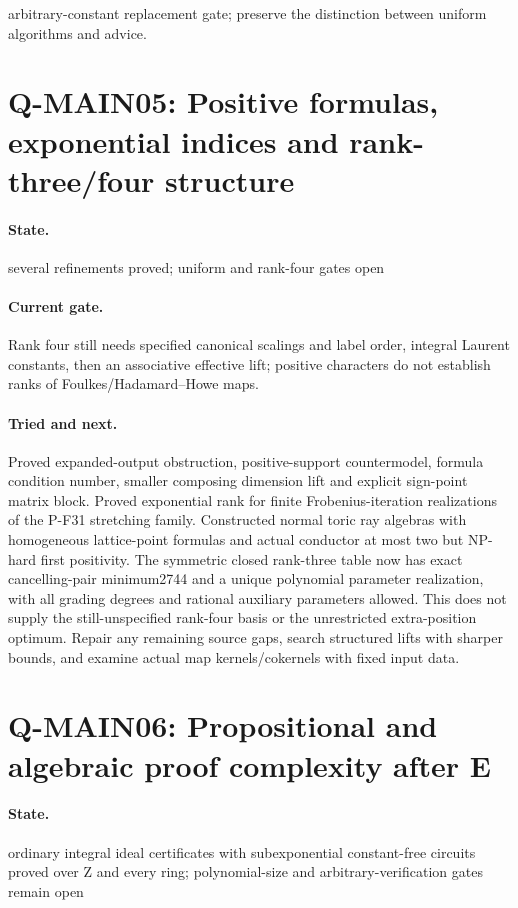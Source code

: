 arbitrary-constant replacement gate; preserve the distinction between uniform algorithms and advice.

\section{Q-MAIN05: Positive formulas, exponential indices and rank-three/four structure}
\paragraph{State.} several refinements proved; uniform and rank-four gates open
\paragraph{Current gate.} Rank four still needs specified canonical scalings and label order, integral Laurent constants, then an associative effective lift; positive characters do not establish ranks of Foulkes/Hadamard--Howe maps.
\paragraph{Tried and next.} Proved expanded-output obstruction, positive-support countermodel, formula condition number, smaller composing dimension lift and explicit sign-point matrix block. Proved exponential rank for finite Frobenius-iteration realizations of the P-F31 stretching family. Constructed normal toric ray algebras with homogeneous lattice-point formulas and actual conductor at most two but NP-hard first positivity. The symmetric closed rank-three table now has exact cancelling-pair minimum2744 and a unique polynomial parameter realization, with all grading degrees and rational auxiliary parameters allowed. This does not supply the still-unspecified rank-four basis or the unrestricted extra-position optimum. Repair any remaining source gaps, search structured lifts with sharper bounds, and examine actual map kernels/cokernels with fixed input data.

\section{Q-MAIN06: Propositional and algebraic proof complexity after E}
\paragraph{State.} ordinary integral ideal certificates with subexponential constant-free circuits proved over Z and every ring; polynomial-size and arbitrary-verification gates remain open
